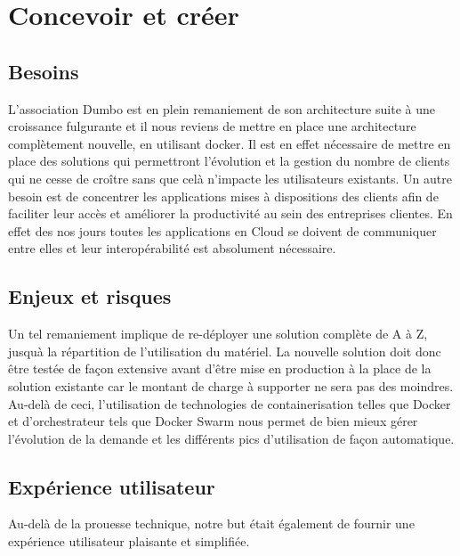 \section{Concevoir et créer}

\subsection{Besoins}

L'association Dumbo est en plein remaniement de son architecture suite à une croissance fulgurante et il nous reviens de mettre en place une architecture complètement nouvelle, en utilisant docker.
Il est en effet nécessaire de mettre en place des solutions qui permettront l'évolution et la gestion du nombre de clients qui ne cesse de croître sans que celà n'impacte les utilisateurs existants.
Un autre besoin est de concentrer les applications mises à dispositions des clients afin de faciliter leur accès et améliorer la productivité au sein des entreprises clientes.
En effet des nos jours toutes les applications en Cloud se doivent de communiquer entre elles et leur interopérabilité est absolument nécessaire.

\subsection{Enjeux et risques}

Un tel remaniement implique de re-déployer une solution complète de A à Z, jusquà la répartition de l'utilisation du matériel.
La nouvelle solution doit donc être testée de façon extensive avant d'être mise en production à la place de la solution existante car le montant de charge à supporter ne sera pas des moindres.
Au-delà de ceci, l'utilisation de technologies de containerisation telles que Docker et d'orchestrateur tels que Docker Swarm nous permet de bien mieux gérer l'évolution de la demande et les différents pics d'utilisation de façon automatique.

\subsection{Expérience utilisateur}

Au-delà de la prouesse technique, notre but était également de fournir une expérience utilisateur plaisante et simplifiée.

